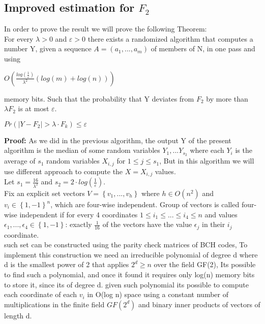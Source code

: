 \documentclass{article}
\begin{document}
\subsection{Improved estimation for \(F_2\)}
In order to prove the result we will prove the following Theorem:\\
For every \(\lambda > 0\) and \(\varepsilon > 0\) there exists a randomized algorithm that computes a number Y, given a sequence \(A = (a_1, ..., a_m)\) of members of N, in one pass and using
\begin{center}
    \(O(\frac{log(\frac{1}{\varepsilon})}{\lambda^2}(log(m) + log(n)))\)
\end{center}
memory bits. Such that the probability that Y deviates from \(F_2\) by more than \(\lambda F_2\) is at most \(\varepsilon\).
\begin{center}
    \(Pr(\left|Y - F_{2} \right|> \lambda \cdot F_{k}) \leq \varepsilon\)
\end{center}
\textbf{Proof:} As we did in the previous algorithm, the output Y of the present algorithm is the median of some random variables \(Y_1, ...Y_{s_2}\) where each \(Y_i\) is the average of \(s_1\) random variables \(X_{i,j}\) for \(1 \leq j \leq s_1\), But in this algorithm we will use different approach to compute the \(X =   X_{i,j}\) values.\\
Let \(s_{1} = \frac{16}{\lambda^{2}}\) and \(s_{2} = 2\cdot log(\frac{1}{\varepsilon })\).\\
Fix an explicit set vectors \(V = \left\{v_1, . . . , v_h \right\}\) where \(h \in O(n^2)\) and \(v_i \in \left\{1,-1 \right\}^n\), which are four-wise independent. Group of vectors is called four-wise independent if for every 4 coordinates \(1 \leq i_1 \leq ... \leq i_4 \leq n\) and values \(\epsilon_1, ..., \epsilon_4 \in \left\{1,-1 \right\}\): exactly \(\frac{1}{16}\) of the vectors have the value \(\epsilon_j\) in their \(i_j\) coordinate.\\
such set can be constructed using the parity check matrices of BCH codes, To implement this construction we need an irreducible polynomial of degree d where d is the smallest power of 2 that applies \(2^d \geq n\) over the field GF(2), Its possible to find such a polynomial, and once it found it requires only log(n) memory bits to store it, since its of degree d. given such polynomial its possible to compute each coordinate of each \(v_i\) in O(log n) space using a constant number of multiplications in the finite field \(GF(2^d)\) and binary inner products of vectors of length d.\\
\end{document}
